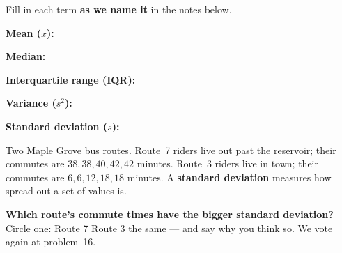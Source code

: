 \documentclass[12pt]{article}
\newcommand{\termrowheight}{2.3cm}
\newlength{\termrowinset}\setlength{\termrowinset}{7pt}
\newcommand{\vterm}[1]{%
  \par\noindent\begin{minipage}[t][\termrowheight][t]{\linewidth}%
    \vspace*{\termrowinset}%
    \textbf{\textcolor{cerulean}{#1:}}%
  \end{minipage}\par}
\begin{document}

\vspace{0.15in}

\begin{vocabbox}
\small
Fill in each term \textbf{as we name it} in the notes below.
\vterm{Mean ($\bar{x}$)}
\vterm{Median}
\vterm{Interquartile range (IQR)}
\vterm{Variance ($s^2$)}
\vterm{Standard deviation ($s$)}
\end{vocabbox}

\boxguard[12]
\begin{hookbox}
\small
Two Maple Grove bus routes. Route~7 riders live out past the reservoir; their commutes are
$38, 38, 40, 42, 42$ minutes. Route~3 riders live in town; their commutes are
$6, 6, 12, 18, 18$ minutes. A \textbf{standard deviation} measures how spread out a set of
values is.

\vspace{3pt}
\textbf{Which route's commute times have the bigger standard deviation?} Circle one: \quad
Route 7 \qquad Route 3 \qquad the same \quad --- and say why you think so. We vote again at
problem~16.
\par{}
\end{hookbox}
\end{document}
